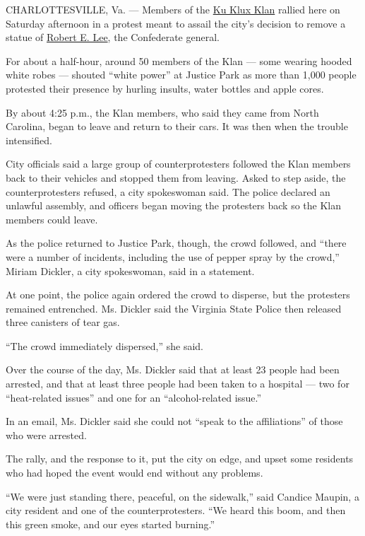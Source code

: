 CHARLOTTESVILLE, Va. --- Members of the
\href{https://www.nytimes3xbfgragh.onion/topic/organization/ku-klux-klan}{Ku
Klux Klan} rallied here on Saturday afternoon in a protest meant to
assail the city's decision to remove a statue of
\href{https://www.nytimes3xbfgragh.onion/topic/person/robert-e-lee?inline=nyt-per}{Robert
E. Lee}, the Confederate general.

For about a half-hour, around 50 members of the Klan --- some wearing
hooded white robes --- shouted ``white power'' at Justice Park as more
than 1,000 people protested their presence by hurling insults, water
bottles and apple cores.

By about 4:25 p.m., the Klan members, who said they came from North
Carolina, began to leave and return to their cars. It was then when the
trouble intensified.

City officials said a large group of counterprotesters followed the Klan
members back to their vehicles and stopped them from leaving. Asked to
step aside, the counterprotesters refused, a city spokeswoman said. The
police declared an unlawful assembly, and officers began moving the
protesters back so the Klan members could leave.

As the police returned to Justice Park, though, the crowd followed, and
``there were a number of incidents, including the use of pepper spray by
the crowd,'' Miriam Dickler, a city spokeswoman, said in a statement.

At one point, the police again ordered the crowd to disperse, but the
protesters remained entrenched. Ms. Dickler said the Virginia State
Police then released three canisters of tear gas.

``The crowd immediately dispersed,'' she said.

Over the course of the day, Ms. Dickler said that at least 23 people had
been arrested, and that at least three people had been taken to a
hospital --- two for ``heat-related issues'' and one for an
``alcohol-related issue.''

In an email, Ms. Dickler said she could not ``speak to the
affiliations'' of those who were arrested.

The rally, and the response to it, put the city on edge, and upset some
residents who had hoped the event would end without any problems.

``We were just standing there, peaceful, on the sidewalk,'' said Candice
Maupin, a city resident and one of the counterprotesters. ``We heard
this boom, and then this green smoke, and our eyes started burning.''

